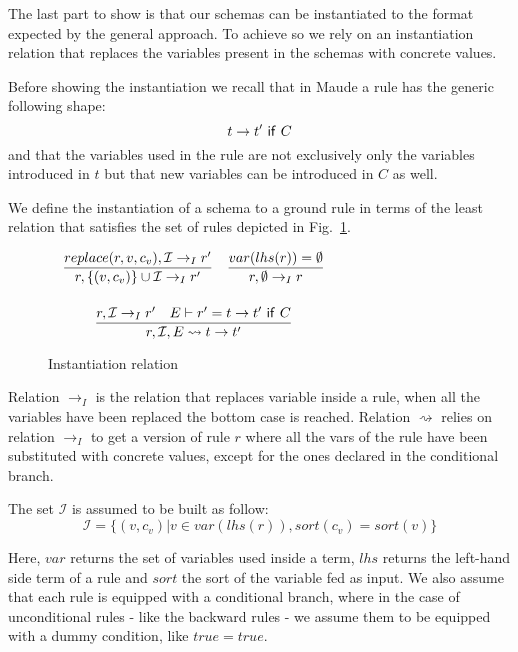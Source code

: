 \documentclass{article}[12pt,a4paper]
\theoremstyle{definition}
\begin{document}
The last part to show is that our schemas can be instantiated to the format
expected by the general approach. To achieve so we rely on an instantiation
relation that replaces the variables present in the schemas with concrete values.

Before showing the instantiation we recall that in Maude a rule has the generic
following shape:
\[t \rightarrow t'~\mathsf{if}~C\]
and that the variables used in the rule are not exclusively only the variables
introduced in $t$ but that new variables can be introduced in $C$ as well.

We define the instantiation of a schema to a ground rule in terms of the least
relation that satisfies the set of rules depicted in Fig.~\ref{fig:inst}.

\begin{figure}
  \centering
  $
  \begin{array}{c}
  \begin{array}{ll}
      \displaystyle
      \frac{replace(r,v,c_v),\mathcal{I}\rightarrow_I r'}
      {r, \{(v,c_v)\}\cup\mathcal{I} \rightarrow_I r'}
    &
      \displaystyle
      \frac{var(lhs(r))=\emptyset}
      {r,\emptyset \rightarrow_I r}
  \end{array}\\[5ex]

  \begin{array}{c}
    \displaystyle
    \frac{r,\mathcal{I}\rightarrow_I r'~~~E\vdash r'=t\rightarrow t'~\ms{if}~C}
    {r, \mathcal{I},E \rightsquigarrow t\rightarrow t'}
  \end{array}
  \end{array}
  $
  \caption{Instantiation relation}
  \label{fig:inst}
\end{figure}

Relation $\rightarrow_I$ is the relation that replaces variable inside a rule,
when all the variables have been replaced the bottom case is reached. Relation
$\rightsquigarrow$ relies on relation $\rightarrow_I$ to get a version of rule $r$
where all the vars of the rule have been substituted with concrete values,
except for the ones declared in the conditional branch.

The set $\mathcal{I}$ is assumed to be built as follow:
\[\mathcal{I}=\{(v,c_v)|v\in var(lhs(r)), sort(c_v)= sort(v)\}\]

Here, $var$ returns the set of variables used inside a term, $lhs$ returns
the left-hand side term of a rule and $sort$ the sort of the variable fed as
input.
We also assume that each rule is equipped with a conditional branch, where in
the case of unconditional rules - like the backward rules - we assume them to be
equipped with a dummy condition, like $true = true$.
\end{document}
